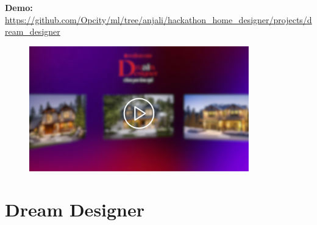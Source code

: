 \documentclass[t,xcolor={dvipsnames}]{beamer} %
\begin{document}
\begin{frame}
\frametitle{\insertsection}
  \textbf{Demo:} \url{https://github.com/Opcity/ml/tree/anjali/hackathon_home_designer/projects/dream_designer}
\vspace{0.2cm}

  \begin{figure}[H]
    \hyperlink{https://github.com/Opcity/ml/blob/anjali/hackathon_home_designer/projects/dream_designer/assets/Dream_designer_demo_recording.mp4}{\includegraphics[width=0.85\textwidth]{data/demo_page.png}}
  \end{figure}

\end{frame}

\section{Dream Designer}
\end{document}
